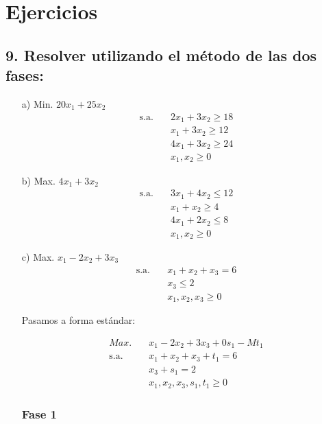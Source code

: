 \section{Ejercicios}

\subsection*{9. Resolver utilizando el método de las dos fases:}

\begin{itemize}
    \item[a)] Min. $20x_1 + 25x_2$
    \begin{align*}
        \text{s.a.} \quad & 2x_1 + 3x_2 \geq 18 \\
        & x_1 + 3x_2 \geq 12 \\
        & 4x_1 + 3x_2 \geq 24 \\
        & x_1, x_2 \geq 0
    \end{align*}
    
    \item[b)] Max. $4x_1 + 3x_2$
    \begin{align*}
        \text{s.a.} \quad & 3x_1 + 4x_2 \leq 12 \\
        & x_1 + x_2 \geq 4 \\
        & 4x_1 + 2x_2 \leq 8 \\
        & x_1, x_2 \geq 0
    \end{align*}
    
    \item[c)] Max. $x_1 - 2x_2 + 3x_3$
    \begin{align*}
        \text{s.a.} \quad & x_1 + x_2 + x_3 = 6 \\
        & x_3 \leq 2 \\
        & x_1, x_2, x_3 \geq 0
    \end{align*}

    Pasamos a forma estándar:

    \begin{align*}
        Max. \quad & x_1 - 2x_2 + 3x_3 + 0s_1 -Mt_1\\
        \text{s.a.} \quad & x_1 + x_2 + x_3 + t_1= 6 \\
        & x_3 + s_1 = 2 \\
        & x_1, x_2, x_3, s_1, t_1 \geq 0
    \end{align*}

    \subsubsection*{Fase 1}


\end{itemize}
